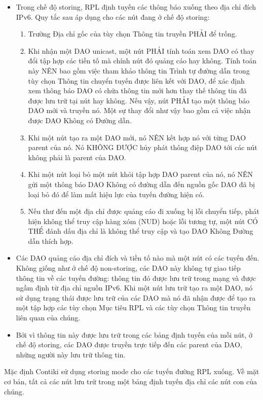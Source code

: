 \documentclass{report}
\begin{document}
\begin{itemize}
	\item Trong chế độ storing, RPL định tuyến các thông báo xuống theo địa chỉ đích IPv6. Quy tắc sau áp dụng cho các nút đang ở chế độ storing:
	\begin{enumerate}
		\item Trường Địa chỉ gốc của tùy chọn Thông tin truyền PHẢI để trống.
		\item Khi nhận một DAO unicast, một nút PHẢI tính toán xem DAO có thay đổi tập hợp các tiền tố mà chính nút đó quảng cáo hay không. Tính toán này NÊN bao gồm việc tham khảo thông tin Trình tự đường dẫn trong tùy chọn Thông tin chuyển tuyến được liên kết với DAO, để xác định xem thông báo DAO có chứa thông tin mới hơn thay thế thông tin đã được lưu trữ tại nút hay không. Nếu vậy, nút PHẢI tạo một thông báo DAO mới và truyền nó. Một sự thay đổi như vậy bao gồm cả việc nhận được DAO Không có Đường dẫn.
		\item Khi một nút tạo ra một DAO mới, nó NÊN kết hợp nó với từng DAO parent của nó. Nó KHÔNG ĐƯỢC hủy phát thông điệp DAO tới các nút không phải là parent của DAO.
		\item Khi một nút loại bỏ một nút khỏi tập hợp DAO parent của nó, nó NÊN gửi một thông báo DAO Không có đường dẫn đến nguồn gốc DAO đã bị loại bỏ đó để làm mất hiệu lực của tuyến đường hiện có.
		\item Nếu thư đến một địa chỉ được quảng cáo đi xuống bị lỗi chuyển tiếp, phát hiện không thể truy cập hàng xóm (NUD) hoặc lỗi tương tự, một nút CÓ THỂ đánh dấu địa chỉ là không thể truy cập và tạo DAO Không Đường dẫn thích hợp.
	\end{enumerate}
	\item Các DAO quảng cáo địa chỉ đích và tiền tố nào mà một nút có các tuyến đến. Không giống như ở chế độ non-storing, các DAO này không tự giao tiếp thông tin về các tuyến đường: thông tin đó được lưu trữ trong mạng và được ngầm định từ địa chỉ nguồn IPv6. Khi một nút lưu trữ tạo ra một DAO, nó sử dụng trạng thái được lưu trữ của các DAO mà nó đã nhận được để tạo ra một tập hợp các tùy chọn Mục tiêu RPL và các tùy chọn Thông tin truyền liên quan của chúng.
	\item Bởi vì thông tin này được lưu trữ trong các bảng định tuyến của mỗi nút, ở chế độ storing, các DAO được truyền trực tiếp đến các parent của DAO, những người này lưu trữ thông tin.
\end{itemize}
Mặc định Contiki sử dụng storing mode cho các tuyến đường RPL xuống. Về mặt
cơ bản, tất cả các nút lưu trữ trong một bảng định tuyến địa chỉ các nút con của
chúng.
\end{document}
